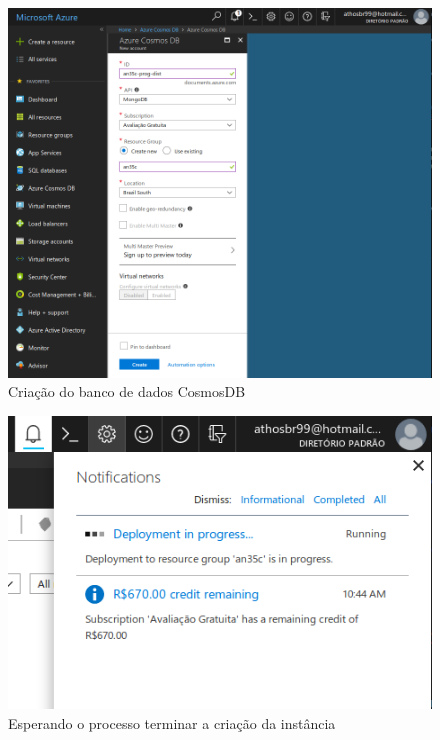 \documentclass[12pt]{article}
\begin{document}
\begin{figure}[H]
	\label{fig:az1}
	\caption{Criação do banco de dados CosmosDB} 
	\includegraphics[scale=0.27]{img/az1.png}
	\centering
\end{figure}

\begin{figure}[H]
	\label{fig:az2}
	\caption{Esperando o processo terminar a criação da instância}
	\includegraphics[scale=0.27]{img/az2.png}
	\centering
\end{figure}
\end{document}
